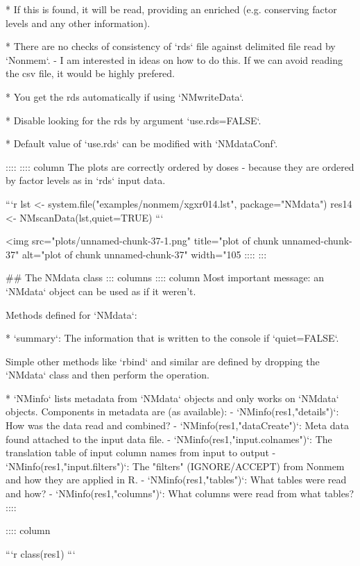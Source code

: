 {{{{{{* If this is found, it will be read, providing an enriched (e.g. conserving factor levels and any other information).

* There are no checks of consistency of `rds` file against delimited file read by `Nonmem`.
- I am interested in ideas on how to do this. If we can avoid reading the csv file, it would be highly prefered.

* You get the rds automatically if using `NMwriteData`.

* Disable looking for the rds by argument `use.rds=FALSE`. 

* Default value of `use.rds` can be modified with `NMdataConf`.

::::
:::: column
The plots are correctly ordered by doses - because they are ordered by factor levels as in `rds` input data.

\footnotesize

```r
lst <- system.file("examples/nonmem/xgxr014.lst",
                   package="NMdata")
res14 <- NMscanData(lst,quiet=TRUE)
```

<img src="plots/unnamed-chunk-37-1.png" title="plot of chunk unnamed-chunk-37" alt="plot of chunk unnamed-chunk-37" width="105%
::::
:::

\normalsize

## The NMdata class
::: columns
:::: column
Most important message: an `NMdata` object can be used as if it weren't. 

Methods defined for `NMdata`:

* `summary`: The information that is written to the console if `quiet=FALSE`.


Simple other methods like `rbind` and similar are defined by dropping the `NMdata` class and then perform the operation.

* `NMinfo` lists metadata from `NMdata` objects and only works on `NMdata` objects. Components in metadata are (as available):
- `NMinfo(res1,"details")`: How was the data read and combined?
- `NMinfo(res1,"dataCreate")`: Meta data found attached to the input data file.
- `NMinfo(res1,"input.colnames")`: The translation table of input column names from input to output
- `NMinfo(res1,"input.filters")`: The "filters" (IGNORE/ACCEPT) from Nonmem and how they are applied in R.
- `NMinfo(res1,"tables")`: What tables were read and how?
- `NMinfo(res1,"columns")`: What columns were read from what tables?
::::

:::: column
\tiny

```r
class(res1)
```

}}}}}}
